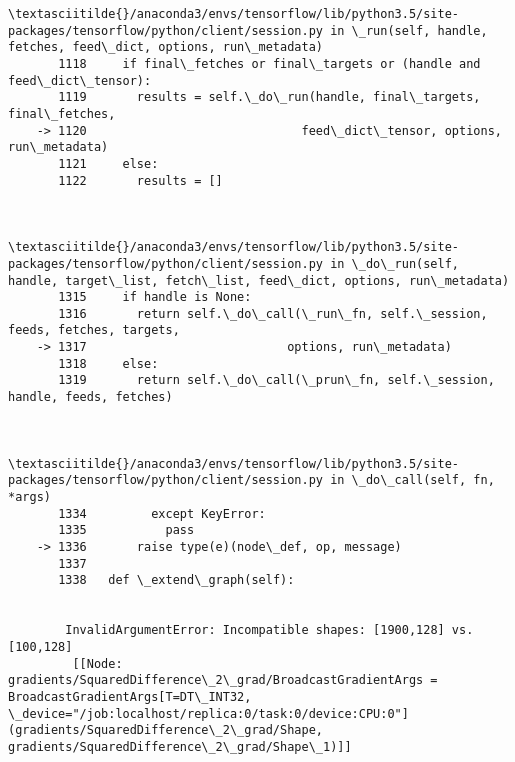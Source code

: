\documentclass[11pt]{article}
\begin{document}
\begin{Verbatim}[commandchars=\\\{\}]
        \textasciitilde{}/anaconda3/envs/tensorflow/lib/python3.5/site-packages/tensorflow/python/client/session.py in \_run(self, handle, fetches, feed\_dict, options, run\_metadata)
       1118     if final\_fetches or final\_targets or (handle and feed\_dict\_tensor):
       1119       results = self.\_do\_run(handle, final\_targets, final\_fetches,
    -> 1120                              feed\_dict\_tensor, options, run\_metadata)
       1121     else:
       1122       results = []


        \textasciitilde{}/anaconda3/envs/tensorflow/lib/python3.5/site-packages/tensorflow/python/client/session.py in \_do\_run(self, handle, target\_list, fetch\_list, feed\_dict, options, run\_metadata)
       1315     if handle is None:
       1316       return self.\_do\_call(\_run\_fn, self.\_session, feeds, fetches, targets,
    -> 1317                            options, run\_metadata)
       1318     else:
       1319       return self.\_do\_call(\_prun\_fn, self.\_session, handle, feeds, fetches)


        \textasciitilde{}/anaconda3/envs/tensorflow/lib/python3.5/site-packages/tensorflow/python/client/session.py in \_do\_call(self, fn, *args)
       1334         except KeyError:
       1335           pass
    -> 1336       raise type(e)(node\_def, op, message)
       1337 
       1338   def \_extend\_graph(self):


        InvalidArgumentError: Incompatible shapes: [1900,128] vs. [100,128]
    	 [[Node: gradients/SquaredDifference\_2\_grad/BroadcastGradientArgs = BroadcastGradientArgs[T=DT\_INT32, \_device="/job:localhost/replica:0/task:0/device:CPU:0"](gradients/SquaredDifference\_2\_grad/Shape, gradients/SquaredDifference\_2\_grad/Shape\_1)]]
    

\end{Verbatim}
\end{document}
